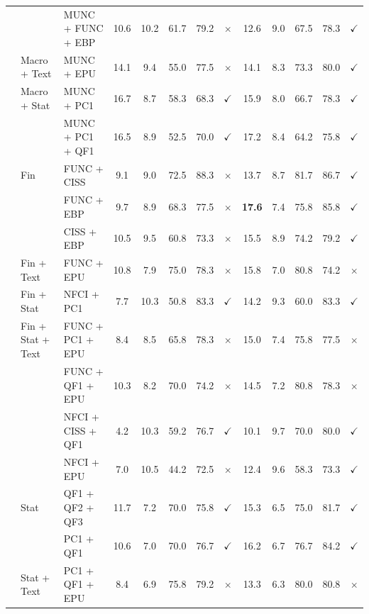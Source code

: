\begin{tabular}{lllCCCCCCCCCC}
&  & MUNC + FUNC + EBP & 10.6 & 10.2 & 61.7 & 79.2 & $\times$ & 12.6 & 9.0 & 67.5 & 78.3 & $\checkmark$\\ 
& Macro + Text & MUNC + EPU & 14.1 & 9.4 & 55.0 & 77.5 & $\times$ & 14.1 & 8.3 & 73.3 & 80.0 & $\checkmark$\\ 
& Macro + Stat & MUNC + PC1 & 16.7 & 8.7 & 58.3 & 68.3 & $\checkmark$ & 15.9 & 8.0 & 66.7 & 78.3 & $\checkmark$\\ 
&  & MUNC + PC1 + QF1 & 16.5 & 8.9 & 52.5 & 70.0 & $\checkmark$ & 17.2 & 8.4 & 64.2 & 75.8 & $\checkmark$\\ 
& Fin & FUNC + CISS & 9.1 & 9.0 & 72.5 & 88.3 & $\times$ & 13.7 & 8.7 & 81.7 & 86.7 & $\checkmark$\\ 
&  & FUNC + EBP & 9.7 & 8.9 & 68.3 & 77.5 & $\times$ & \textbf{17.6} & 7.4 & 75.8 & 85.8 & $\checkmark$\\ 
&  & CISS + EBP & 10.5 & 9.5 & 60.8 & 73.3 & $\times$ & 15.5 & 8.9 & 74.2 & 79.2 & $\checkmark$\\ 
& Fin + Text & FUNC + EPU & 10.8 & 7.9 & 75.0 & 78.3 & $\times$ & 15.8 & 7.0 & 80.8 & 74.2 & $\times$\\ 
& Fin + Stat & NFCI + PC1 & 7.7 & 10.3 & 50.8 & 83.3 & $\checkmark$ & 14.2 & 9.3 & 60.0 & 83.3 & $\checkmark$\\ 
& Fin + Stat + Text & FUNC + PC1 + EPU & 8.4 & 8.5 & 65.8 & 78.3 & $\times$ & 15.0 & 7.4 & 75.8 & 77.5 & $\times$\\ 
&  & FUNC + QF1 + EPU & 10.3 & 8.2 & 70.0 & 74.2 & $\times$ & 14.5 & 7.2 & 80.8 & 78.3 & $\times$\\ 
&  & NFCI + CISS + QF1 & 4.2 & 10.3 & 59.2 & 76.7 & $\checkmark$ & 10.1 & 9.7 & 70.0 & 80.0 & $\checkmark$\\ 
&  & NFCI + EPU & 7.0 & 10.5 & 44.2 & 72.5 & $\times$ & 12.4 & 9.6 & 58.3 & 73.3 & $\checkmark$\\ 
& Stat & QF1 + QF2 + QF3 & 11.7 & 7.2 & 70.0 & 75.8 & $\checkmark$ & 15.3 & 6.5 & 75.0 & 81.7 & $\checkmark$\\ 
&  & PC1 + QF1 & 10.6 & 7.0 & 70.0 & 76.7 & $\checkmark$ & 16.2 & 6.7 & 76.7 & 84.2 & $\checkmark$\\ 
& Stat + Text & PC1 + QF1 + EPU & 8.4 & 6.9 & 75.8 & 79.2 & $\times$ & 13.3 & 6.3 & 80.0 & 80.8 & $\times$\\ 
\toprule 
\end{tabular}
